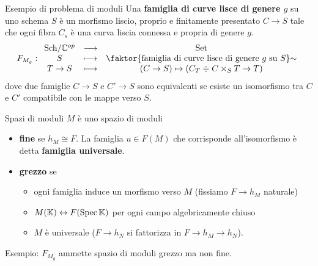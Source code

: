 \documentclass[a4paper]{beamer}
\begin{document}
\begin{frame}{Esempio di problema di moduli}
Una \textbf{famiglia di curve lisce di genere $g$} su uno schema $S$ \`e un morfismo liscio, proprio e finitamente presentato $C\to S$ tale che ogni fibra $C_s$ \`e una curva liscia connessa e propria di genere $g$.
\[F_{M_g}:\functorDef{\Sch\C\op}{\Set}{S}{\quot{\cpa{\text{famiglia di curve lisce di genere $g$ su $S$}}}\sim}{T\to S}{(C\to S)\mapsto (C_T\doteqdot C\times_S T\to T)}\]
dove due famiglie $C\to S$ e $C'\to S$ sono equivalenti se esiste un isomorfismo tra $C$ e $C'$ compatibile con le mappe verso $S$.
\begin{center}
\end{center}
\end{frame}

\begin{frame}{Spazi di moduli}
$M$ \`e uno spazio di moduli\pause
\begin{itemize}
\item \textbf{fine} se $h_M\cong F$. La famiglia $u\in F(M)$ che corrisponde all'isomorfismo \`e detta \textbf{famiglia universale}.\pause
\item \textbf{grezzo} se 
\begin{itemize}
\item ogni famiglia induce un morfismo verso $M$ (fissiamo $F\to h_M$ naturale)
\item $M(\mathbb{K})\leftrightarrow F(\mathrm{Spec}\,\mathbb{K})$ per ogni campo algebricamente chiuso
\item $M$ \`e universale ($F\to h_N$ si fattorizza in $F\to h_M\to h_N$).
\end{itemize}
\end{itemize}
\medskip\pause

Esempio: $F_{M_g}$ ammette spazio di moduli grezzo ma non fine.
\end{frame}
\end{document}
